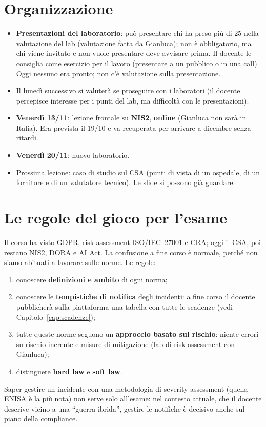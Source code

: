 \section{Organizzazione}
\begin{itemize}
  \item \textbf{Presentazioni del laboratorio}: può presentare chi ha preso più di 25 nella
    valutazione del lab (valutazione fatta da Gianluca); non è obbligatorio, ma chi viene invitato e non
    vuole presentare deve avvisare prima. Il docente le consiglia come esercizio per il lavoro (presentare
    a un pubblico o in una call). Oggi nessuno era pronto; non c'è valutazione sulla presentazione.
  \item Il lunedì successivo si valuterà se proseguire con i laboratori (il docente percepisce interesse
    per i punti del lab, ma difficoltà con le presentazioni).
  \item \textbf{Venerdì 13/11}: lezione frontale su \textbf{NIS2}, \textbf{online} (Gianluca non sarà in
    Italia). Era prevista il 19/10 e va recuperata per arrivare a dicembre senza ritardi.
  \item \textbf{Venerdì 20/11}: nuovo laboratorio.
  \item Prossima lezione: caso di studio sul CSA (punti di vista di un ospedale, di un fornitore e di
    un valutatore tecnico). Le slide si possono già guardare.
\end{itemize}

\section{Le regole del gioco per l'esame}
Il corso ha visto GDPR, risk assessment ISO/IEC~27001 e CRA; oggi il CSA, poi restano NIS2, DORA e
AI Act. La confusione a fine corso è normale, perché non siamo abituati a lavorare sulle norme. Le
regole:
\begin{enumerate}
  \item conoscere \textbf{definizioni e ambito} di ogni norma;
  \item conoscere le \textbf{tempistiche di notifica} degli incidenti: a fine corso il docente pubblicherà
    sulla piattaforma una tabella con tutte le scadenze (vedi Capitolo~\ref{cap:scadenze});
  \item tutte queste norme seguono un \textbf{approccio basato sul rischio}: niente errori su rischio
    inerente e misure di mitigazione (lab di risk assessment con Gianluca);
  \item distinguere \textbf{hard law} e \textbf{soft law}.
\end{enumerate}
Saper gestire un incidente con una metodologia di severity assessment (quella ENISA è la più nota)
non serve solo all'esame: nel contesto attuale, che il docente descrive vicino a una ``guerra
ibrida'', gestire le notifiche è decisivo anche sul piano della compliance.

